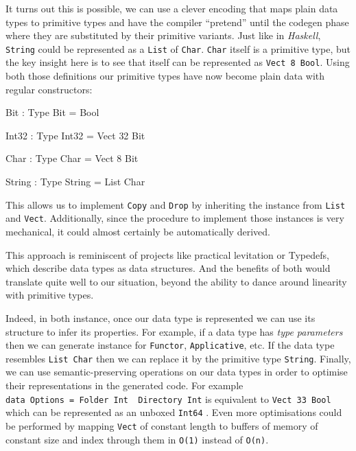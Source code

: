 \documentclass[
]{article}
\newenvironment{Shaded}{}{}
\newcommand{\DataTypeTok}[1]{\textcolor[rgb]{0.56,0.13,0.00}{#1}}
\newcommand{\DecValTok}[1]{\textcolor[rgb]{0.25,0.63,0.44}{#1}}
\newcommand{\OperatorTok}[1]{\textcolor[rgb]{0.40,0.40,0.40}{#1}}
\newcommand{\OtherTok}[1]{\textcolor[rgb]{0.00,0.44,0.13}{#1}}
\begin{document}
It turns out this is possible, we can use a clever encoding that maps
plain data types to primitive types and have the compiler ``pretend''
until the codegen phase where they are substituted by their primitive
variants. Just like in \emph{Haskell}, \texttt{String} could be
represented as a \texttt{List} of \texttt{Char}. \texttt{Char} itself is
a primitive type, but the key insight here is to see that itself can be
represented as \texttt{Vect\ 8\ Bool}. Using both those definitions our
primitive types have now become plain data with regular constructors:

\begin{Shaded}
\begin{Highlighting}[]
\DataTypeTok{Bit} \OperatorTok{:} \DataTypeTok{Type}
\DataTypeTok{Bit} \OtherTok{=} \DataTypeTok{Bool}

\DataTypeTok{Int32} \OperatorTok{:} \DataTypeTok{Type}
\DataTypeTok{Int32} \OtherTok{=} \DataTypeTok{Vect} \DecValTok{32} \DataTypeTok{Bit}

\DataTypeTok{Char} \OperatorTok{:} \DataTypeTok{Type}
\DataTypeTok{Char} \OtherTok{=} \DataTypeTok{Vect} \DecValTok{8} \DataTypeTok{Bit}

\DataTypeTok{String} \OperatorTok{:} \DataTypeTok{Type}
\DataTypeTok{String} \OtherTok{=} \DataTypeTok{List} \DataTypeTok{Char}
\end{Highlighting}
\end{Shaded}

This allows us to implement \texttt{Copy} and \texttt{Drop} by
inheriting the instance from \texttt{List} and \texttt{Vect}.
Additionally, since the procedure to implement those instances is very
mechanical, it could almost certainly be automatically derived.

This approach is reminiscent of projects like practical levitation or
Typedefs, which describe data types as data structures. And the benefits
of both would translate quite well to our situation, beyond the ability
to dance around linearity with primitive types.

Indeed, in both instance, once our data type is represented we can use
its structure to infer its properties. For example, if a data type has
\emph{type parameters} then we can generate instance for
\texttt{Functor}, \texttt{Applicative}, etc. If the data type resembles
\texttt{List\ Char} then we can replace it by the primitive type
\texttt{String}. Finally, we can use semantic-preserving operations on
our data types in order to optimise their representations in the
generated code. For example
\texttt{data\ Options\ =\ Folder\ Int\ \textbar{}\ Directory\ Int} is
equivalent to \texttt{Vect\ 33\ Bool} which can be represented as an
unboxed \texttt{Int64} . Even more optimisations could be performed by
mapping \texttt{Vect} of constant length to buffers of memory of
constant size and index through them in \texttt{O(1)} instead of
\texttt{O(n)}.
\end{document}

